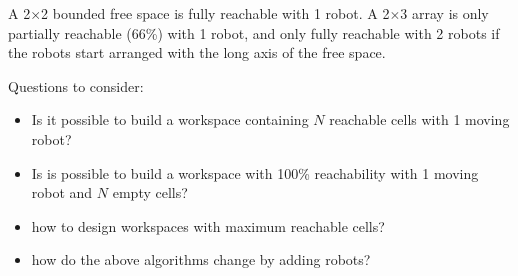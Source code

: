 \documentclass[letterpaper, 10 pt, conference]{ieeeconf}
\begin{document}
A 2$\times$2 bounded free space is fully reachable with 1 robot.  A 2$\times$3 array is only partially reachable (66\%) with 1 robot, and only fully reachable with 2 robots if the robots start arranged with the long axis of the free space.

Questions to consider:
\begin{itemize}
\item  Is it possible to build a workspace containing $N$ reachable cells with 1 moving robot?
\item Is is possible to build a workspace with 100\% reachability with 1 moving robot and $N$ empty cells?
\item how to design workspaces with maximum reachable cells?
\item how do the above algorithms change by adding robots?
\end{itemize}




    
    
   

\end{document}
